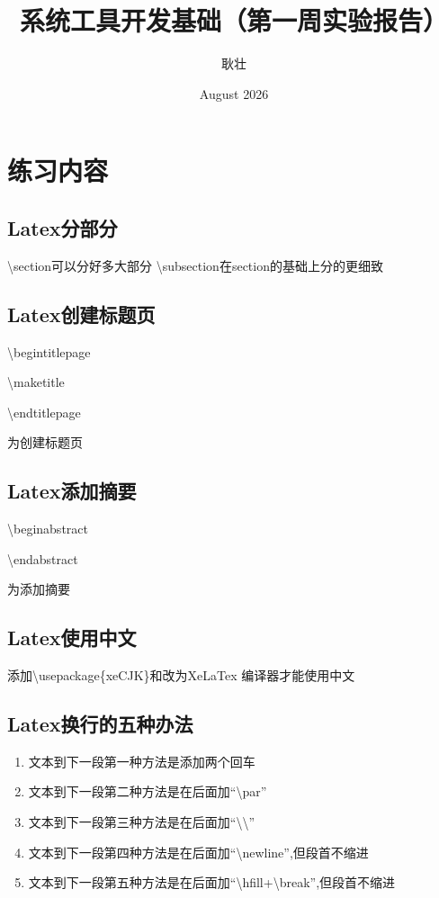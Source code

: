 \documentclass{article}
\title{\textbf{\huge 系统工具开发基础（第一周实验报告）}}
\author{\LARGE 耿壮}
\date{August 2026}
\begin{document}
\begin{titlepage}
\maketitle
\end{titlepage}
\section{\LARGE 练习内容}
\subsection{Latex分部分}
\textbackslash{section}可以分好多大部分
\textbackslash{subsection}在section的基础上分的更细致
\subsection{Latex创建标题页}
\begin{flushleft}
\textbackslash{begin{titlepage}}\par
\textbackslash{maketitle}\par
\textbackslash{end{titlepage}}\par
为创建标题页
\end{flushleft}
\subsection{Latex添加摘要}
\begin{flushleft}
\textbackslash{begin{abstract}}  \par
\textbackslash{end{abstract}}\par
为添加摘要
\end{flushleft}
\subsection{Latex使用中文}
添加\textbackslash{usepackage\{xeCJK\}}和改为XeLaTex 编译器才能使用中文
\subsection{Latex换行的五种办法}
\begin{enumerate}    
\item 文本到下一段第一种方法是添加两个回车\newline
\item 文本到下一段第二种方法是在后面加“\textbackslash{par}”\newline
\item 文本到下一段第三种方法是在后面加“\textbackslash\textbackslash”\newline
\item 文本到下一段第四种方法是在后面加“\textbackslash{newline}”,但段首不缩进\newline
\item 文本到下一段第五种方法是在后面加“\textbackslash{hfill}+\textbackslash{break}”,但段首不缩进
\end{enumerate}
\end{document}
